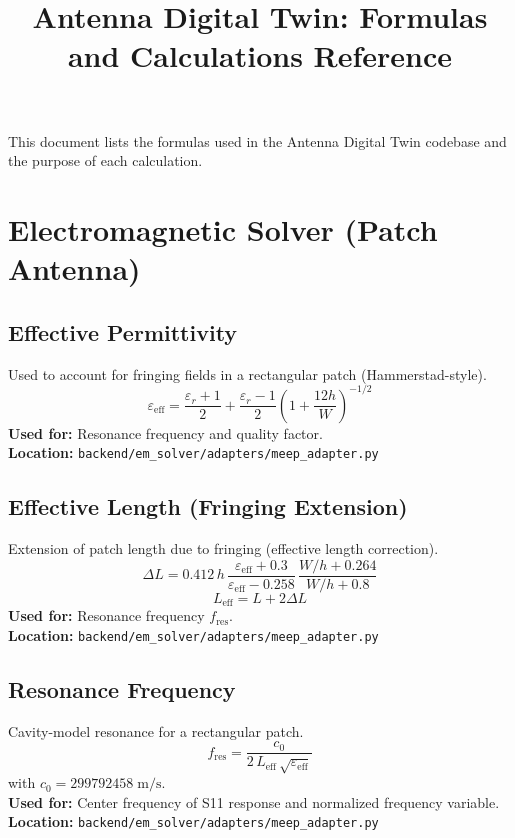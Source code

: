 \documentclass[11pt,a4paper]{article}
\title{Antenna Digital Twin: Formulas and Calculations Reference}
\author{}
\date{}
\begin{document}
\maketitle

This document lists the formulas used in the Antenna Digital Twin codebase and the purpose of each calculation.

\section{Electromagnetic Solver (Patch Antenna)}

\subsection{Effective Permittivity}
Used to account for fringing fields in a rectangular patch (Hammerstad-style).
\begin{equation}
\varepsilon_{\mathrm{eff}}
= \frac{\varepsilon_r + 1}{2}
+ \frac{\varepsilon_r - 1}{2}
\left(1 + \frac{12h}{W}\right)^{-1/2}
\end{equation}
\textbf{Used for:} Resonance frequency and quality factor. \\
\textbf{Location:} \texttt{backend/em\_solver/adapters/meep\_adapter.py}

\subsection{Effective Length (Fringing Extension)}
Extension of patch length due to fringing (effective length correction).
\begin{equation}
\Delta L = 0.412\, h\,
\frac{\varepsilon_{\mathrm{eff}} + 0.3}{\varepsilon_{\mathrm{eff}} - 0.258}\,
\frac{W/h + 0.264}{W/h + 0.8}
\end{equation}
\begin{equation}
L_{\mathrm{eff}} = L + 2\Delta L
\end{equation}
\textbf{Used for:} Resonance frequency \(f_{\mathrm{res}}\). \\
\textbf{Location:} \texttt{backend/em\_solver/adapters/meep\_adapter.py}

\subsection{Resonance Frequency}
Cavity-model resonance for a rectangular patch.
\begin{equation}
f_{\mathrm{res}} = \frac{c_0}{2\, L_{\mathrm{eff}}\, \sqrt{\varepsilon_{\mathrm{eff}}}}
\end{equation}
with \(c_0 = 299792458\;\mathrm{m/s}\). \\
\textbf{Used for:} Center frequency of S11 response and normalized frequency variable. \\
\textbf{Location:} \texttt{backend/em\_solver/adapters/meep\_adapter.py}
\end{document}

